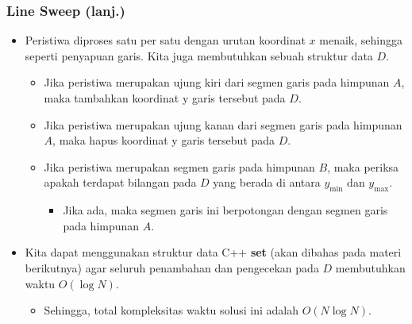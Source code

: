 \begin{frame}[fragile]
\frametitle{Line Sweep (lanj.)}
\begin{itemize}
  \item Peristiwa diproses satu per satu dengan urutan koordinat $x$ menaik, sehingga seperti penyapuan garis. Kita juga membutuhkan sebuah struktur data $D$.
  \begin{itemize}
    \item Jika peristiwa merupakan ujung kiri dari segmen garis pada himpunan $A$, maka tambahkan koordinat y garis tersebut pada $D$.
    \item Jika peristiwa merupakan ujung kanan dari segmen garis pada himpunan $A$, maka hapus koordinat y garis tersebut pada $D$.
    \item Jika peristiwa merupakan segmen garis pada himpunan $B$, maka periksa apakah terdapat bilangan pada $D$ yang berada di antara $y_{\min}$ dan $y_{\max}$.
    \begin{itemize}
      \item Jika ada, maka segmen garis ini berpotongan dengan segmen garis pada himpunan $A$.
    \end{itemize}
  \end{itemize}
  \item Kita dapat menggunakan struktur data C++ \textbf{set} (akan dibahas pada materi berikutnya) agar seluruh penambahan dan pengecekan pada $D$ membutuhkan waktu $O(\log N)$.
  \begin{itemize}
    \item Sehingga, total kompleksitas waktu solusi ini adalah $O(N \log N)$.
  \end{itemize}
\end{itemize}
\end{frame}


